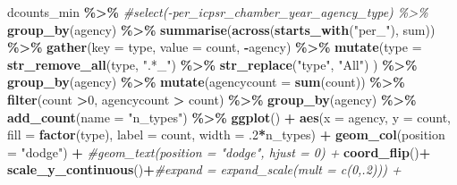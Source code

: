 \documentclass[
]{article}
\newenvironment{Shaded}{\begin{snugshade}}{\end{snugshade}}
\newcommand{\CommentTok}[1]{\textcolor[rgb]{0.56,0.35,0.01}{\textit{#1}}}
\newcommand{\DataTypeTok}[1]{\textcolor[rgb]{0.13,0.29,0.53}{#1}}
\newcommand{\DecValTok}[1]{\textcolor[rgb]{0.00,0.00,0.81}{#1}}
\newcommand{\FloatTok}[1]{\textcolor[rgb]{0.00,0.00,0.81}{#1}}
\newcommand{\KeywordTok}[1]{\textcolor[rgb]{0.13,0.29,0.53}{\textbf{#1}}}
\newcommand{\NormalTok}[1]{#1}
\newcommand{\OperatorTok}[1]{\textcolor[rgb]{0.81,0.36,0.00}{\textbf{#1}}}
\newcommand{\StringTok}[1]{\textcolor[rgb]{0.31,0.60,0.02}{#1}}
\begin{document}
\begin{Shaded}
\begin{Highlighting}[]
\NormalTok{dcounts\_min }\OperatorTok{\%\textgreater{}\%}\StringTok{ }
\StringTok{  }\CommentTok{\#select({-}per\_icpsr\_chamber\_year\_agency\_type) \%\textgreater{}\%}
\StringTok{  }\KeywordTok{group\_by}\NormalTok{(agency) }\OperatorTok{\%\textgreater{}\%}\StringTok{ }
\StringTok{  }\KeywordTok{summarise}\NormalTok{(}\KeywordTok{across}\NormalTok{(}\KeywordTok{starts\_with}\NormalTok{(}\StringTok{"per\_"}\NormalTok{), sum)) }\OperatorTok{\%\textgreater{}\%}\StringTok{ }
\StringTok{  }\KeywordTok{gather}\NormalTok{(}\DataTypeTok{key =}\NormalTok{ type, }\DataTypeTok{value =}\NormalTok{ count, }\OperatorTok{{-}}\NormalTok{agency) }\OperatorTok{\%\textgreater{}\%}
\StringTok{  }\KeywordTok{mutate}\NormalTok{(}\DataTypeTok{type =} \KeywordTok{str\_remove\_all}\NormalTok{(type, }\StringTok{".*\_"}\NormalTok{) }\OperatorTok{\%\textgreater{}\%}\StringTok{ }\KeywordTok{str\_replace}\NormalTok{(}\StringTok{"type"}\NormalTok{, }\StringTok{"All"}\NormalTok{) ) }\OperatorTok{\%\textgreater{}\%}
\StringTok{  }\KeywordTok{group\_by}\NormalTok{(agency) }\OperatorTok{\%\textgreater{}\%}\StringTok{ }
\StringTok{  }\KeywordTok{mutate}\NormalTok{(}\DataTypeTok{agencycount =} \KeywordTok{sum}\NormalTok{(count)) }\OperatorTok{\%\textgreater{}\%}
\StringTok{  }\KeywordTok{filter}\NormalTok{(count }\OperatorTok{\textgreater{}}\DecValTok{0}\NormalTok{, agencycount }\OperatorTok{\textgreater{}}\StringTok{ }\NormalTok{count) }\OperatorTok{\%\textgreater{}\%}
\StringTok{  }\KeywordTok{group\_by}\NormalTok{(agency) }\OperatorTok{\%\textgreater{}\%}\StringTok{ }
\StringTok{  }\KeywordTok{add\_count}\NormalTok{(}\DataTypeTok{name =} \StringTok{"n\_types"}\NormalTok{) }\OperatorTok{\%\textgreater{}\%}\StringTok{ }
\StringTok{  }\KeywordTok{ggplot}\NormalTok{() }\OperatorTok{+}\StringTok{ }
\StringTok{  }\KeywordTok{aes}\NormalTok{(}\DataTypeTok{x =}\NormalTok{ agency, }\DataTypeTok{y =}\NormalTok{ count, }\DataTypeTok{fill =} \KeywordTok{factor}\NormalTok{(type), }\DataTypeTok{label =}\NormalTok{ count, }\DataTypeTok{width =} \FloatTok{.2}\OperatorTok{*}\NormalTok{n\_types) }\OperatorTok{+}
\StringTok{  }\KeywordTok{geom\_col}\NormalTok{(}\DataTypeTok{position =} \StringTok{"dodge"}\NormalTok{) }\OperatorTok{+}
\StringTok{  }\CommentTok{\#geom\_text(position = "dodge", hjust = 0) + }
\StringTok{  }\KeywordTok{coord\_flip}\NormalTok{()}\OperatorTok{+}\StringTok{ }
\StringTok{  }\KeywordTok{scale\_y\_continuous}\NormalTok{()}\OperatorTok{+}\CommentTok{\#expand = expand\_scale(mult =  c(0,.2))) +}

\end{Highlighting}
\end{Shaded}
\end{document}
